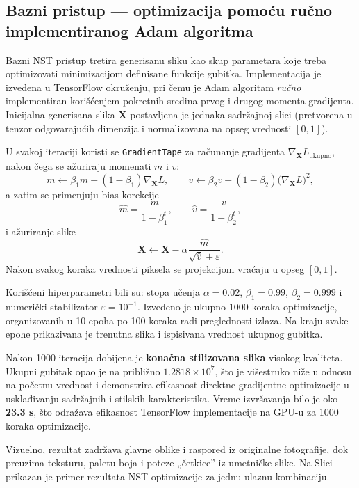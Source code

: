 \documentclass[a4paper,12pt]{article}
\begin{document}
\subsection{Bazni pristup — optimizacija pomoću ručno implementiranog Adam algoritma}
Bazni NST pristup tretira generisanu sliku kao skup parametara koje treba optimizovati minimizacijom definisane funkcije gubitka. Implementacija je izvedena u TensorFlow okruženju, pri čemu je Adam algoritam \emph{ručno} implementiran korišćenjem pokretnih sredina prvog i drugog momenta gradijenta. Inicijalna generisana slika $\mathbf{X}$ postavljena je jednaka sadržajnoj slici (pretvorena u tenzor odgovarajućih dimenzija i normalizovana na opseg vrednosti $[0,1]$).

U svakoj iteraciji koristi se \texttt{GradientTape} za računanje gradijenta $\nabla_{\mathbf{X}} L_{\text{ukupno}}$, nakon čega se ažuriraju momenati $m$ i $v$:
\[
m \leftarrow \beta_1 m + (1-\beta_1)\nabla_{\mathbf{X}} L, \qquad
v \leftarrow \beta_2 v + (1-\beta_2)\big(\nabla_{\mathbf{X}} L\big)^2,
\]
a zatim se primenjuju bias-korekcije
\[
\hat m = \frac{m}{1-\beta_1^t}, \qquad
\hat v = \frac{v}{1-\beta_2^t},
\]
i ažuriranje slike
\[
\mathbf{X} \leftarrow \mathbf{X} - \alpha \frac{\hat m}{\sqrt{\hat v}+\varepsilon}.
\]
Nakon svakog koraka vrednosti piksela se projekcijom vraćaju u opseg $[0,1]$.

Korišćeni hiperparametri bili su: stopa učenja $\alpha=0.02$, $\beta_1=0.99$, $\beta_2=0.999$ i numerički stabilizator $\varepsilon=10^{-1}$. Izvedeno je ukupno 1000 koraka optimizacije, organizovanih u 10 epoha po 100 koraka radi preglednosti izlaza. Na kraju svake epohe prikazivana je trenutna slika i ispisivana vrednost ukupnog gubitka.

Nakon 1000 iteracija dobijena je \textbf{konačna stilizovana slika} visokog kvaliteta. Ukupni gubitak opao je na približno $1.2818\times 10^{7}$, što je višestruko niže u odnosu na početnu vrednost i demonstrira efikasnost direktne gradijentne optimizacije u usklađivanju sadržajnih i stilskih karakteristika. Vreme izvršavanja bilo je oko \textbf{23.3 s}, što odražava efikasnost TensorFlow implementacije na GPU-u za 1000 koraka optimizacije.

Vizuelno, rezultat zadržava glavne oblike i raspored iz originalne fotografije, dok preuzima teksturu, paletu boja i poteze „četkice” iz umetničke slike. Na Slici prikazan je primer rezultata NST optimizacije za jednu ulaznu kombinaciju.
\end{document}
